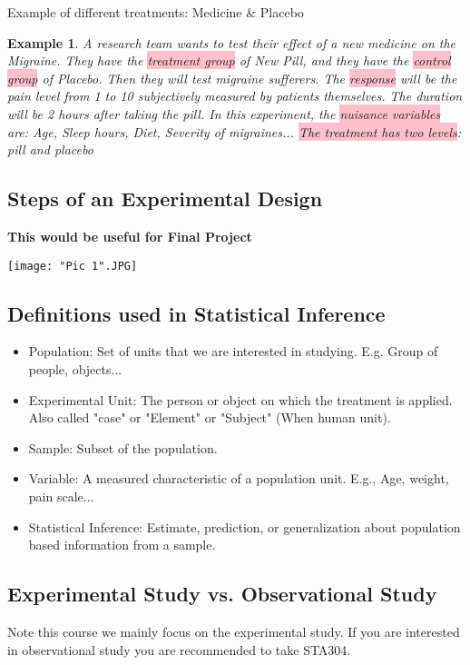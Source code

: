 \documentclass[a4paper,11pt]{article}
\newtheorem{eg}[thm]{Example}
\begin{document}
Example of different treatments: Medicine \& Placebo
\begin{eg}
\normalfont
A research team wants to test their effect of a new medicine on the Migraine. They have the \colorbox{pink}{treatment group} of New Pill, and they have the \colorbox{pink}{control group} of Placebo. Then they will test migraine sufferers. The \colorbox{pink}{response} will be the pain level from 1 to 10 subjectively measured by patients themselves. The duration will be 2 hours after taking the pill. In this experiment, the \colorbox{pink}{nuisance variables} are: Age, Sleep hours, Diet, Severity of migraines... \colorbox{pink}{The treatment has two levels}: pill and placebo
\end{eg}
\newpage
\subsection{Steps of an Experimental Design}
\textbf{This would be useful for Final Project}

\begin{center}
	\texttt{[image: "Pic 1".JPG]}
\end{center}

\subsection{Definitions used in Statistical Inference}
\begin{itemize}
\item Population: Set of units that we are interested in studying. E.g. Group of people, objects...
\item Experimental Unit: The person or object on which the treatment is applied. Also called "case" or "Element" or "Subject" (When human unit). 
\item Sample: Subset of the population.
\item Variable: A measured characteristic of a population unit. E.g., Age, weight, pain scale... 
\item Statistical Inference: Estimate, prediction, or generalization about population based information from a sample. 
\end{itemize}

\subsection{Experimental Study vs. Observational Study}
Note this course we mainly focus on the experimental study. If you are interested in observational study you are recommended to take STA304. 
\end{document}
